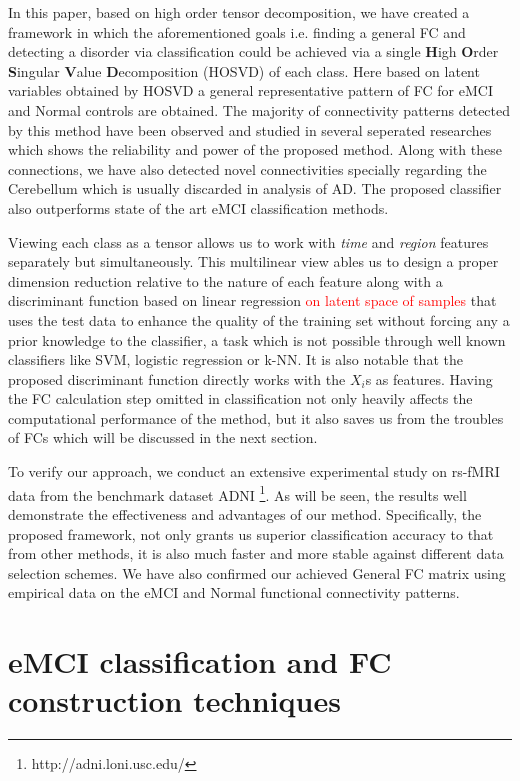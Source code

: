 \documentclass[preprint,12pt]{elsarticle}
\begin{document}
						
	In this paper, based on high order tensor decomposition, we have created a framework in which the aforementioned goals i.e. finding a general FC and detecting a disorder via classification could be achieved via a single \textbf{H}igh \textbf{O}rder \textbf{S}ingular \textbf{V}alue \textbf{D}ecomposition (HOSVD) of each class.
	 Here based on latent variables obtained by HOSVD a general representative pattern of FC for eMCI and Normal controls are obtained. 
	 The majority of connectivity patterns detected by this method have been observed and studied in several seperated researches which shows the reliability and power of the proposed method. Along with these connections, we have also detected novel connectivities specially regarding the Cerebellum which is usually discarded in analysis of AD.     
	 The proposed classifier also outperforms state of the art eMCI classification methods. 
	 
	 Viewing each class as a tensor allows us to work with \textit{time} and \textit{region} features separately but simultaneously. This multilinear view
	  ables us to design a proper dimension reduction relative to the nature of each feature along with a discriminant function based on linear regression \textcolor{red}{on latent space of samples} that uses the test data to enhance the quality of the training set without forcing any a prior knowledge to the classifier, a task which is not possible through well known classifiers like SVM, logistic regression or k-NN. It is also notable that the proposed discriminant function directly works with the $X_i$s as features. Having the FC calculation step omitted in classification not only heavily affects the computational performance of the method, but it also saves us from the troubles of FCs which will be discussed in the next section.   
	  
	  To verify our approach, we conduct an extensive experimental study on rs-fMRI data from the
	  	benchmark dataset ADNI
	  	\footnote{http://adni.loni.usc.edu/}.
	  	As will be seen, the results well demonstrate the effectiveness and advantages of our method. Specifically, the proposed framework, not only grants us superior classification accuracy to that from other methods, it is also much faster and more stable against different data selection schemes. We have also confirmed our achieved General FC matrix using empirical data on the eMCI and Normal functional connectivity patterns.
	  	
							 
	\section{eMCI classification and FC construction techniques}\label{related_works}
\end{document}
